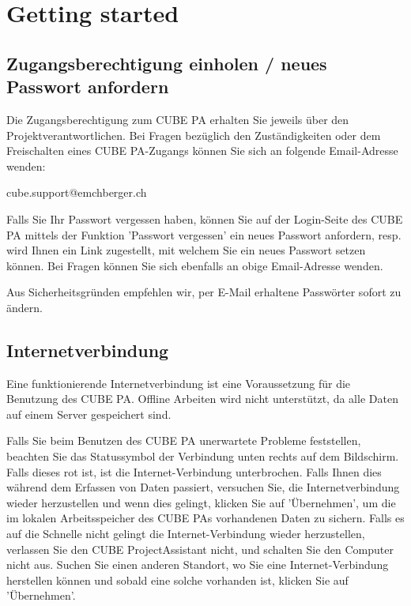 
\section{Getting started}
\subsection{Zugangsberechtigung einholen / neues Passwort anfordern}


Die Zugangsberechtigung zum CUBE PA erhalten Sie jeweils über den Projektverantwortlichen. Bei Fragen bezüglich den Zuständigkeiten oder dem Freischalten eines CUBE PA-Zugangs können Sie sich an folgende Email-Adresse wenden:

\vspace{\baselineskip}

{\color{red} cube.support@emchberger.ch}

\vspace{\baselineskip}

Falls Sie Ihr Passwort vergessen haben, können Sie auf der Login-Seite des CUBE PA mittels der Funktion 'Passwort vergessen' ein neues Passwort anfordern, resp. wird Ihnen ein Link zugestellt, mit welchem Sie ein neues Passwort setzen können. Bei Fragen können Sie sich ebenfalls an obige Email-Adresse wenden.

\vspace{\baselineskip}

Aus Sicherheitsgründen empfehlen wir, per E-Mail erhaltene Passwörter sofort zu ändern.

\subsection{Internetverbindung}

Eine funktionierende Internetverbindung ist eine Voraussetzung für die Benutzung des CUBE PA. Offline Arbeiten wird nicht unterstützt, da alle Daten auf einem Server gespeichert sind.

\vspace{\baselineskip}

Falls Sie beim Benutzen des CUBE PA unerwartete Probleme feststellen, beachten Sie das Statussymbol der Verbindung unten rechts auf dem Bildschirm. Falls dieses rot ist, ist die Internet-Verbindung unterbrochen. Falls Ihnen dies während dem Erfassen von Daten passiert, versuchen Sie, die Internetverbindung wieder herzustellen und wenn dies gelingt, klicken Sie auf 'Übernehmen', um die im lokalen Arbeitsspeicher des CUBE PAs vorhandenen Daten zu sichern. Falls es auf die Schnelle nicht gelingt die Internet-Verbindung wieder herzustellen, verlassen Sie den CUBE ProjectAssistant nicht, und schalten Sie den Computer nicht aus. Suchen Sie einen anderen Standort, wo Sie eine Internet-Verbindung herstellen
können und sobald eine solche vorhanden ist, klicken Sie auf 'Übernehmen'.

